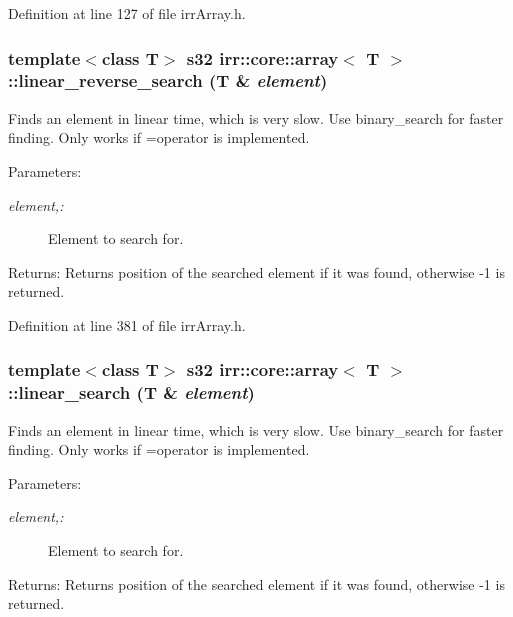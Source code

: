 Definition at line 127 of file irrArray.h.\hypertarget{classirr_1_1core_1_1array_4efb7d86fc42e6b29e932f983d6ffae0}{
\subsubsection[{linear\_\-reverse\_\-search}]{\setlength{\rightskip}{0pt plus 5cm}template$<$class T$>$ {\bf s32} {\bf irr::core::array}$<$ T $>$::linear\_\-reverse\_\-search (T \& {\em element})}}
\label{classirr_1_1core_1_1array_4efb7d86fc42e6b29e932f983d6ffae0}


Finds an element in linear time, which is very slow. Use binary\_\-search for faster finding. Only works if =operator is implemented. \begin{Desc}
\item[Parameters:]
\begin{description}
\item[{\em element,:}]Element to search for. \end{description}
\end{Desc}
\begin{Desc}
\item[Returns:]Returns position of the searched element if it was found, otherwise -1 is returned. \end{Desc}


Definition at line 381 of file irrArray.h.\hypertarget{classirr_1_1core_1_1array_917e0d2690b9871d2d13d9ec0a3626f5}{
\subsubsection[{linear\_\-search}]{\setlength{\rightskip}{0pt plus 5cm}template$<$class T$>$ {\bf s32} {\bf irr::core::array}$<$ T $>$::linear\_\-search (T \& {\em element})}}
\label{classirr_1_1core_1_1array_917e0d2690b9871d2d13d9ec0a3626f5}


Finds an element in linear time, which is very slow. Use binary\_\-search for faster finding. Only works if =operator is implemented. \begin{Desc}
\item[Parameters:]
\begin{description}
\item[{\em element,:}]Element to search for. \end{description}
\end{Desc}
\begin{Desc}
\item[Returns:]Returns position of the searched element if it was found, otherwise -1 is returned. \end{Desc}


